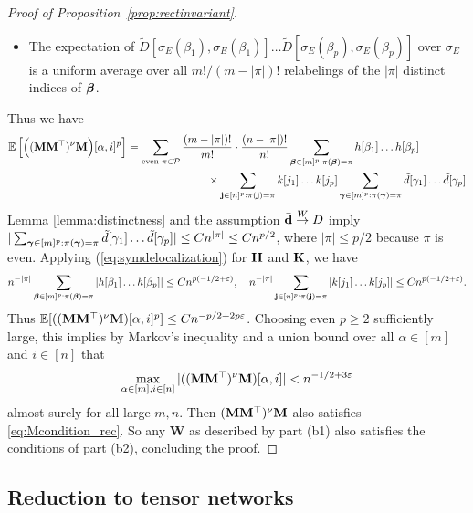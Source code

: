 \documentclass[10pt,reqno]{amsart}
\def\E{\mathbb{E}}
\def\toW{\overset{W}{\to}}
\def\bW{{\mathbf{W}}}
\def\eps{\varepsilon}
\begin{document}
\begin{proof}[Proof of Proposition~\ref{prop:rectinvariant}]
\begin{itemize}
$(n-|\pi|)!/n!$.
\item The expectation of $\tilde{D}[\sigma_E(\beta_1),\sigma_E(\beta_1)]
\ldots \tilde{D}[\sigma_E(\beta_p),\sigma_E(\beta_p)]$ over 
$\sigma_E$ is a uniform average over all $m!/(m-|\pi|)!$ relabelings of the
$|\pi|$ distinct indices of $\bm{\beta}$.
\end{itemize}
Thus we have
\begin{align*}
\E\left[\Big((\bM\bM^\top)^\nu \bM\Big)[\alpha,i]^p\right]
&=\sum_{\text{even } \pi \in \cP}
\frac{(m-|\pi|)!}{m!} \cdot \frac{(n-|\pi|)!}{n!}
\sum_{\bbeta \in [m]^p:\pi(\bbeta)=\pi} h[\beta_1]\ldots h[\beta_p]\\
&\hspace{1in}\times \sum_{\bj \in [n]^p:\pi(\bj)=\pi} k[j_1]\ldots k[j_p]
\sum_{\bgamma \in [m]^p:\pi(\bgamma)=\pi} \tilde d[\gamma_1]\ldots \tilde
d[\gamma_p]
\end{align*}
Lemma \ref{lemma:distinctness} and the assumption $\bar \bd \toW D$ imply
$|\sum_{\bm{\gamma} \in [m]^p:\pi(\bm{\gamma})=\pi} \tilde d[\gamma_1]\ldots \tilde
d[\gamma_p]| \leq Cn^{|\pi|} \leq Cn^{p/2}$, where $|\pi| \leq p/2$ because
$\pi$ is even. Applying (\ref{eq:symdelocalization}) for
$\mathbf{H}$ and $\mathbf{K}$, we have
\[n^{-|\pi|}
\sum_{\bbeta \in [m]^p:\pi(\bbeta)=\pi} |h[\beta_1]\ldots h[\beta_p]| \leq
Cn^{p(-1/2+\eps)}, \quad n^{-|\pi|}
\sum_{\bj \in [n]^p:\pi(\bj)=\pi} |k[j_1]\ldots k[j_p]| \leq
Cn^{p(-1/2+\eps)}.\]
Thus $\E[((\bM\bM^\top)^\nu \bM)[\alpha,i]^p] \leq Cn^{-p/2+2p\eps}$.
Choosing even $p \geq 2$ sufficiently large, this
implies by Markov's inequality and a union bound over all $\alpha \in [m]$
and $i \in [n]$ that
\[\max_{\alpha \in [m],i \in [n]} |((\bM\bM^\top)^\nu \bM)[\alpha,i]|
<n^{-1/2+3\eps}\]
almost surely for all large $m,n$. Then
$(\mathbf{M}\mathbf{M}^\top)^\nu \mathbf{M}$ also satisfies \eqref{eq:Mcondition_rec}.
So any $\bW$ as described by part (b1) also satisfies the conditions of
part (b2), concluding the proof.
\end{proof}

\subsection{Reduction to tensor networks}\label{subsec:recttensor}
\end{document}
